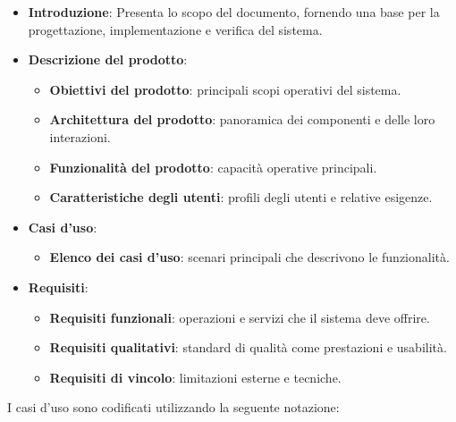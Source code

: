 \begin{itemize}
    \item \textbf{Introduzione}:  
    Presenta lo scopo del documento, fornendo una base per la progettazione, implementazione e verifica del sistema.

    \item \textbf{Descrizione del prodotto}:  
    \begin{itemize}
        \item \textbf{Obiettivi del prodotto}: principali scopi operativi del sistema.
        \item \textbf{Architettura del prodotto}: panoramica dei componenti e delle loro interazioni.
        \item \textbf{Funzionalità del prodotto}: capacità operative principali.
        \item \textbf{Caratteristiche degli utenti}: profili degli utenti e relative esigenze.
    \end{itemize}

    \item \textbf{Casi d’uso}:  
    \begin{itemize}
        \item \textbf{Elenco dei casi d’uso}: scenari principali che descrivono le funzionalità.
    \end{itemize}

    \item \textbf{Requisiti}:  
    \begin{itemize}
        \item \textbf{Requisiti funzionali}: operazioni e servizi che il sistema deve offrire.
        \item \textbf{Requisiti qualitativi}: standard di qualità come prestazioni e usabilità.
        \item \textbf{Requisiti di vincolo}: limitazioni esterne e tecniche.
    \end{itemize}
\end{itemize}


I casi d'uso sono codificati utilizzando la seguente notazione:

